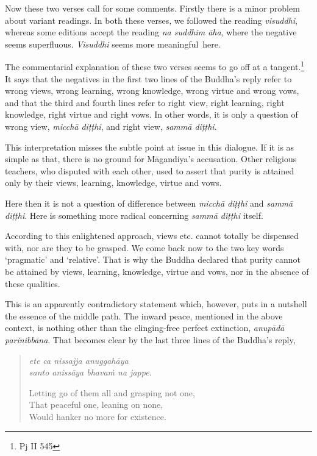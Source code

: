 Now these two verses call for some comments. Firstly there is a minor problem about variant readings. In both these verses, we followed the reading \emph{visuddhi}, whereas some editions accept the reading \emph{na suddhim āha}, where the negative seems superfluous. \emph{Visuddhi} seems more meaningful~here.

The commentarial explanation of these two verses seems to go off at a tangent.\footnote{Pj II 545} It says that the negatives in the first two lines of the Buddha's reply refer to wrong views, wrong learning, wrong knowledge, wrong virtue and wrong vows, and that the third and fourth lines refer to right view, right learning, right knowledge, right virtue and right vows. In other words, it is only a question of wrong view, \emph{micchā diṭṭhi}, and right view, \emph{sammā diṭṭhi}.

This interpretation misses the subtle point at issue in this dialogue. If it is as simple as that, there is no ground for Māgandiya's accusation. Other religious teachers, who disputed with each other, used to assert that purity is attained only by their views, learning, knowledge, virtue and vows.

Here then it is not a question of difference between \emph{micchā diṭṭhi} and \emph{sammā diṭṭhi}. Here is something more radical concerning \emph{sammā diṭṭhi} itself.

According to this enlightened approach, views etc. cannot totally be dispensed with, nor are they to be grasped. We come back now to the two key words `pragmatic' and `relative'. That is why the Buddha declared that purity cannot be attained by views, learning, knowledge, virtue and vows, nor in the absence of these qualities.

This is an apparently contradictory statement which, however, puts in a nutshell the essence of the middle path. The inward peace, mentioned in the above context, is nothing other than the clinging-free perfect extinction, \emph{anupādā parinibbāna}. That becomes clear by the last three lines of the Buddha's reply,

\enlargethispage{\baselineskip}

\begin{quote}
\emph{ete ca nissajja anuggahāya}\\
\emph{santo anissāya bhavaṁ na jappe.}

Letting go of them all and grasping not one,\\
That peaceful one, leaning on none,\\
Would hanker no more for existence.
\end{quote}

